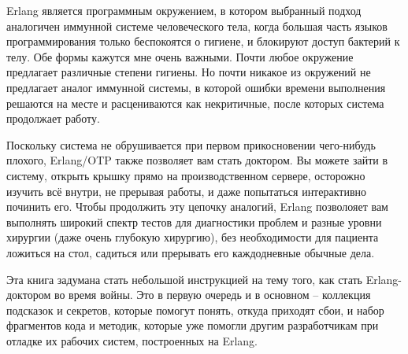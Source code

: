 \documentclass[11pt, oneside]{book}   	%
\begin{document}
Erlang является программным окружением, в котором выбранный подход аналогичен иммун\-ной системе человеческого тела, когда большая часть языков программирования только беспоко\-ятся о гигиене, и блокируют доступ бактерий к телу. Обе формы кажутся мне очень важными. Почти любое окружение предлагает различные степени гигиены. Но почти никакое из окружений не предлагает аналог иммунной системы, в которой ошибки времени выполнения решаются на месте и расцениваются как некритичные, после которых система продолжает работу.

Поскольку система не обрушивается при первом прикосновении чего-нибудь плохого, Erlang/OTP также позволяет вам стать доктором. Вы можете зайти в систему, открыть крышку прямо на производственном сервере, осторожно изучить всё внутри, не прерывая работы, и даже попытаться интерактивно починить его. Чтобы продолжить эту цепочку аналогий, Erlang позволояет вам выполнять широкий спектр тестов для диагностики проблем и разные уровни хирургии (даже очень глубокую хирургию), без необходимости для пациента ложиться на стол, садиться или прерывать его каждодневные обычные дела.

Эта книга задумана стать небольшой инструкцией на тему того, как стать Erlang-доктором во время войны. Это в первую очередь и в основном -- коллекция подсказок и секретов, которые помогут понять, откуда приходят сбои, и набор фрагментов кода и методик, которые уже помогли другим разработчикам при отладке их рабочих систем, построенных на Erlang.
\end{document}
